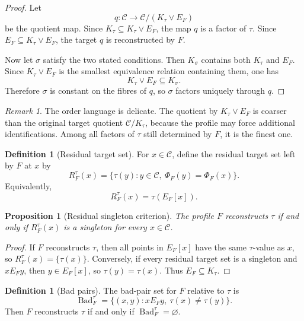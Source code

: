 \documentclass[11pt]{article}
\newtheorem{proposition}[theorem]{Proposition}
\theoremstyle{definition}
\newtheorem{definition}[theorem]{Definition}
\theoremstyle{remark}
\newtheorem{remark}[theorem]{Remark}
\begin{document}
\begin{proof}
Let
\[
q:\mathcal C\to \mathcal C/(K_\tau\vee E_F)
\]
be the quotient map.  Since \(K_\tau\subseteq K_\tau\vee E_F\), the map \(q\) is a factor of \(\tau\).  Since \(E_F\subseteq K_\tau\vee E_F\), the target \(q\) is reconstructed by \(F\).

Now let \(\sigma\) satisfy the two stated conditions.  Then \(K_\sigma\) contains both \(K_\tau\) and \(E_F\).  Since \(K_\tau\vee E_F\) is the smallest equivalence relation containing them, one has
\[
K_\tau\vee E_F\subseteq K_\sigma.
\]
Therefore \(\sigma\) is constant on the fibres of \(q\), so \(\sigma\) factors uniquely through \(q\).
\end{proof}

\begin{remark}
The order language is delicate.  The quotient by \(K_\tau\vee E_F\) is coarser than the original target quotient \(\mathcal C/K_\tau\), because the profile may force additional identifications.  Among all factors of \(\tau\) still determined by \(F\), it is the finest one.
\end{remark}

\begin{definition}[Residual target set]
For \(x\in\mathcal C\), define the residual target set left by \(F\) at \(x\) by
\[
R_F^\tau(x)=\{\tau(y):y\in\mathcal C,\ \Phi_F(y)=\Phi_F(x)\}.
\]
Equivalently,
\[
R_F^\tau(x)=\tau(E_F[x]).
\]
\end{definition}

\begin{proposition}[Residual singleton criterion]
The profile \(F\) reconstructs \(\tau\) if and only if \(R_F^\tau(x)\) is a singleton for every \(x\in\mathcal C\).
\end{proposition}

\begin{proof}
If \(F\) reconstructs \(\tau\), then all points in \(E_F[x]\) have the same \(\tau\)-value as \(x\), so \(R_F^\tau(x)=\{\tau(x)\}\).  Conversely, if every residual target set is a singleton and \(xE_Fy\), then \(y\in E_F[x]\), so \(\tau(y)=\tau(x)\).  Thus \(E_F\subseteq K_\tau\).
\end{proof}

\begin{definition}[Bad pairs]
The bad-pair set for \(F\) relative to \(\tau\) is
\[
\operatorname{Bad}_F^\tau
=
\{(x,y):xE_Fy,\ \tau(x)\neq\tau(y)\}.
\]
Then \(F\) reconstructs \(\tau\) if and only if \(\operatorname{Bad}_F^\tau=\varnothing\).
\end{definition}
\end{document}
